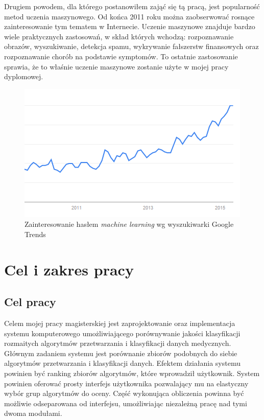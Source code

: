 \documentclass[../thesis.tex]{subfiles}
\begin{document}
Drugiem powodem, dla którego postanowiłem zająć się tą pracą, jest popularność metod uczenia maszynowego. Od końca 2011 roku można zaobserwować rosnące zainteresowanie tym tematem w Internecie. Uczenie maszynowe znajduje bardzo wiele praktycznych zastosowań, w skład których wchodzą: rozpoznawanie obrazów, wyszukiwanie, detekcja spamu, wykrywanie fałszerstw finansowych oraz rozpoznawanie chorób na podstawie symptomów. To ostatnie zastosowanie sprawia, że to właśnie uczenie maszynowe zostanie użyte w mojej pracy dyplomowej.

\begin{figure}[h]
\centering
\includegraphics{ml_chart.png}
\caption{Zainteresowanie hasłem \textit{machine learning} wg wyszukiwarki Google Trends}
\label{intro:ml_chart}
\end{figure}

\section{Cel i zakres pracy}

\subsection{Cel pracy}

Celem mojej pracy magisterskiej jest zaprojektowanie oraz implementacja systemu komputerowego umożliwiającego porównywanie jakości klasyfikacji rozmaitych algorytmów przetwarzania i klasyfikacji danych medycznych. Głównym zadaniem systemu jest porównanie zbiorów podobnych do siebie algorytmów przetwarzania i klasyfikacji danych. Efektem działania systemu powinien być ranking zbiorów algorytmów, które wprowadził użytkownik. System powinien oferować prosty interfejs użytkownika pozwalający mu na elastyczny wybór grup algorytmów do oceny. Część wykonująca obliczenia powinna być możliwie odseparowana od interfejsu, umożliwiając niezależną pracę nad tymi dwoma modułami.
\end{document}
